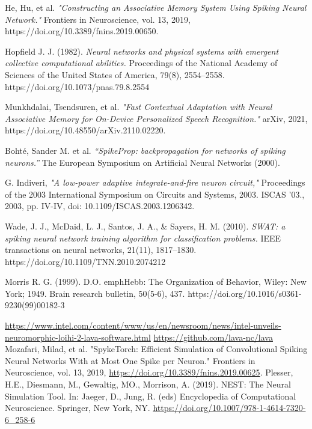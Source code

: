 \begin{thebibliography}{99}

	He, Hu, et al. \emph{"Constructing an Associative Memory System Using Spiking Neural Network."} Frontiers in Neuroscience, vol. 13, 2019, https://doi.org/10.3389/fnins.2019.00650.

	Hopfield J. J. (1982). \emph{Neural networks and physical systems with emergent collective computational abilities.} Proceedings of the National Academy of Sciences of the United States of America, 79(8), 2554–2558. https://doi.org/10.1073/pnas.79.8.2554

	Munkhdalai, Tsendsuren, et al. \emph{"Fast Contextual Adaptation with Neural Associative Memory for On-Device Personalized Speech Recognition."} arXiv, 2021, https://doi.org/10.48550/arXiv.2110.02220.

	Bohté, Sander M. et al. \emph{“SpikeProp: backpropagation for networks of spiking neurons.”} The European Symposium on Artificial Neural Networks (2000).

	G. Indiveri, \emph{"A low-power adaptive integrate-and-fire neuron circuit,"} Proceedings of the 2003 International Symposium on Circuits and Systems, 2003. ISCAS '03., 2003, pp. IV-IV, doi: 10.1109/ISCAS.2003.1206342.

	Wade, J. J., McDaid, L. J., Santos, J. A., \& Sayers, H. M. (2010). \emph{SWAT: a spiking neural network training algorithm for classification problems.} IEEE transactions on neural networks, 21(11), 1817–1830. https://doi.org/10.1109/TNN.2010.2074212

	Morris R. G. (1999). D.O. emph{Hebb: The Organization of Behavior,} Wiley: New York; 1949. Brain research bulletin, 50(5-6), 437. https://doi.org/10.1016/s0361-9230(99)00182-3


	 \url{https://www.intel.com/content/www/us/en/newsroom/news/intel-unveils-neuromorphic-loihi-2-lava-software.html}
	 \url{https://github.com/lava-nc/lava}
	 Mozafari, Milad, et al. "SpykeTorch: Efficient Simulation of Convolutional Spiking Neural Networks With at Most One Spike per Neuron." Frontiers in Neuroscience, vol. 13, 2019, \url{https://doi.org/10.3389/fnins.2019.00625}.
	Plesser, H.E., Diesmann, M., Gewaltig, MO., Morrison, A. (2019). NEST: The Neural Simulation Tool. In: Jaeger, D., Jung, R. (eds) Encyclopedia of Computational Neuroscience. Springer, New York, NY. \url{https://doi.org/10.1007/978-1-4614-7320-6_258-6}
\end{thebibliography}